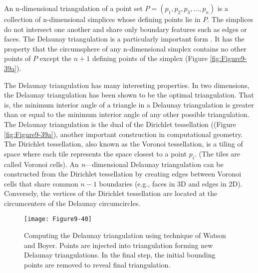 \begin{description}[leftmargin=0cm,labelindent=0cm]
An n-dimensional triangulation of a point set $P = (p_1, p_2, p_3, ..., p_n)$ is a collection of n-dimensional simplices whose defining points lie in $P$. The simplices do not intersect one another and share only boundary features such as edges or faces. The Delaunay triangulation is a particularly important form \cite{Bowyer81} \cite{Watson81}. It has the property that the circumsphere of any n-dimensional simplex contains no other points of $P$ except the $n+1$ defining points of the simplex (Figure \ref{fig:Figure9-39a}).

The Delaunay triangulation has many interesting properties. In two dimensions, the Delaunay triangulation has been shown to be the optimal triangulation. That is, the minimum interior angle of a triangle in a Delaunay triangulation is greater than or equal to the minimum interior angle of any other possible triangulation. The Delaunay triangulation is the dual of the Dirichlet tessellation ((Figure  \ref{fig:Figure9-39a}), another important construction in computational geometry. The Dirichlet tessellation, also known as the Voronoi tessellation, is a tiling of space where each tile represents the space closest to a point $p_i$. (The tiles are called Voronoi cells). An \emph{n}---dimensional Delaunay triangulation can be constructed from the Dirichlet tessellation by creating edges between Voronoi cells that share common $n-1$ boundaries (e.g., faces in 3D and edges in 2D). Conversely, the vertices of the Dirichlet tessellation are located at the circumcenters of the Delaunay circumcircles.

\begin{figure}[!htb]
	\centering
	\texttt{[image: Figure9-40]}
	\caption{Computing the Delaunay triangulation using technique of Watson and Boyer. Points are injected into triangulation forming new Delaunay triangulations. In the final step, the initial bounding points are removed to reveal final triangulation.}
	\label{fig:Figure9-40}
\end{figure}


\end{description}
